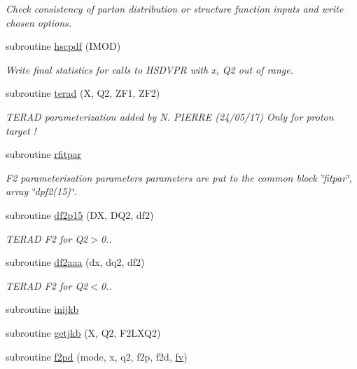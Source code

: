 \begin{DoxyCompactItemize}
\begin{DoxyCompactList}\small\item\em Check consistency of parton distribution or structure function inputs and write chosen options. \end{DoxyCompactList}\item 
subroutine \hyperlink{djangoh__h_8f_a948c29703e0ad618c41e77d47f6b9dcc}{hscpdf} (I\+M\+OD)
\begin{DoxyCompactList}\small\item\em Write final statistics for calls to H\+S\+D\+V\+PR with x, Q2 out of range. \end{DoxyCompactList}\item 
subroutine \hyperlink{djangoh__h_8f_a8b060a39c51e672f84e910a6e0554b14}{terad} (X, Q2, Z\+F1, Z\+F2)
\begin{DoxyCompactList}\small\item\em T\+E\+R\+AD parameterization added by N. P\+I\+E\+R\+RE (24/05/17) Only for proton target ! \end{DoxyCompactList}\item 
subroutine \hyperlink{djangoh__h_8f_ac5d143251cf0caaa44dc2183c8ffd5a9}{rfitpar}
\begin{DoxyCompactList}\small\item\em F2 parameterisation parameters parameters are put to the common block \char`\"{}fitpar\char`\"{}, array \char`\"{}dpf2(15)\char`\"{}. \end{DoxyCompactList}\item 
subroutine \hyperlink{djangoh__h_8f_a4b60d6f62111a87a451b64de759d0f77}{df2p15} (DX, D\+Q2, df2)
\begin{DoxyCompactList}\small\item\em T\+E\+R\+AD F2 for Q2$>$0.. \end{DoxyCompactList}\item 
subroutine \hyperlink{djangoh__h_8f_a9c1d49c79978a27e782b40d36813ac68}{df2aaa} (dx, dq2, df2)
\begin{DoxyCompactList}\small\item\em T\+E\+R\+AD F2 for Q2$<$0.. \end{DoxyCompactList}\item 
subroutine \hyperlink{djangoh__h_8f_a2184ecd632178b8a20e056a2bdd9515c}{inijkb}
\item 
subroutine \hyperlink{djangoh__h_8f_af73206177be49131c913d5499a251929}{getjkb} (X, Q2, F2\+L\+X\+Q2)
\item 
subroutine \hyperlink{djangoh__h_8f_a67daa21721b2c5babecb24bd220d034f}{f2pd} (mode, x, q2, f2p, f2d, \hyperlink{djangoh__h_8f_a348f1db876b776eb46668701b6a206e4}{fv})

\end{DoxyCompactItemize}
